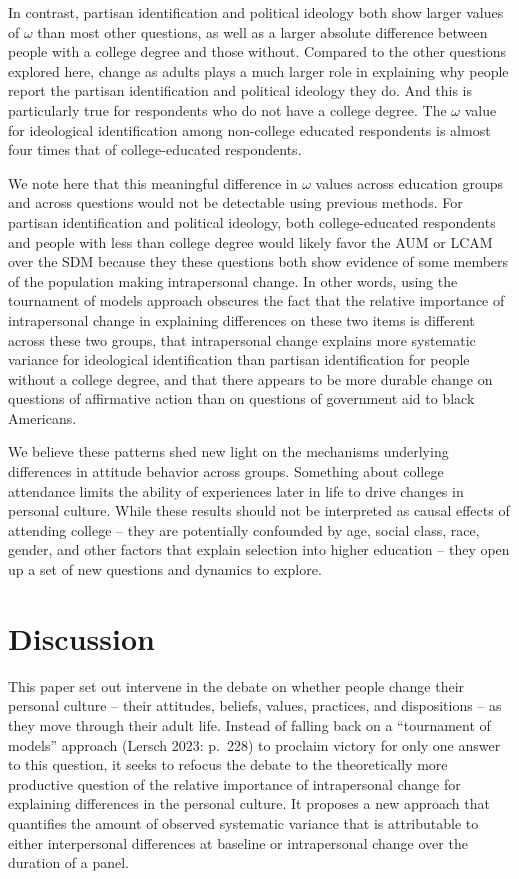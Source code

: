 \documentclass[
  12pt,
]{article}
\begin{document}
In contrast, partisan identification and political ideology both show
larger values of \(\omega\) than most other questions, as well as a
larger absolute difference between people with a college degree and
those without. Compared to the other questions explored here, change as
adults plays a much larger role in explaining why people report the
partisan identification and political ideology they do. And this is
particularly true for respondents who do not have a college degree. The
\(\omega\) value for ideological identification among non-college
educated respondents is almost four times that of college-educated
respondents.

We note here that this meaningful difference in \(\omega\) values across
education groups and across questions would not be detectable using
previous methods. For partisan identification and political ideology,
both college-educated respondents and people with less than college
degree would likely favor the AUM or LCAM over the SDM because they
these questions both show evidence of some members of the population
making intrapersonal change. In other words, using the tournament of
models approach obscures the fact that the relative importance of
intrapersonal change in explaining differences on these two items is
different across these two groups, that intrapersonal change explains
more systematic variance for ideological identification than partisan
identification for people without a college degree, and that there
appears to be more durable change on questions of affirmative action
than on questions of government aid to black Americans.

We believe these patterns shed new light on the mechanisms underlying
differences in attitude behavior across groups. Something about college
attendance limits the ability of experiences later in life to drive
changes in personal culture. While these results should not be
interpreted as causal effects of attending college -- they are
potentially confounded by age, social class, race, gender, and other
factors that explain selection into higher education -- they open up a
set of new questions and dynamics to explore.

\hypertarget{discussion}{%
\section{Discussion}\label{discussion}}

This paper set out intervene in the debate on whether people change
their personal culture -- their attitudes, beliefs, values, practices,
and dispositions -- as they move through their adult life. Instead of
falling back on a ``tournament of models'' approach (Lersch 2023:
p.~228) to proclaim victory for only one answer to this question, it
seeks to refocus the debate to the theoretically more productive
question of the relative importance of intrapersonal change for
explaining differences in the personal culture. It proposes a new
approach that quantifies the amount of observed systematic variance that
is attributable to either interpersonal differences at baseline or
intrapersonal change over the duration of a panel.
\end{document}
